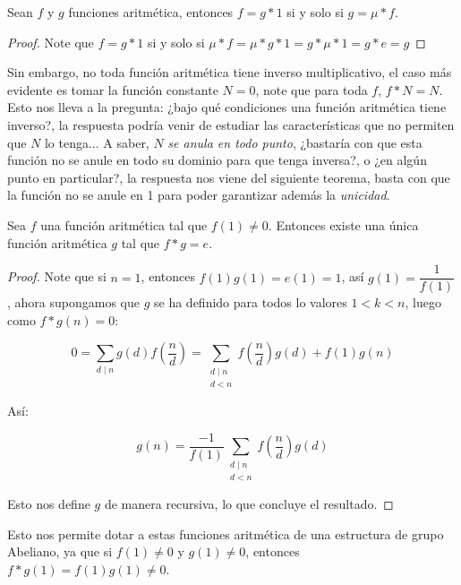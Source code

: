 \begin{theorem}
Sean $f$ y $g$ funciones aritmética, entonces $f=g*1$ si y solo si $g=\mu* f$.
\end{theorem}

\begin{proof}
Note que $f=g*1$ si y solo si $\mu*f=\mu*g*1=g*\mu*1=g*e=g$
\end{proof}

Sin embargo, no toda función aritmética tiene inverso multiplicativo, el caso más evidente es tomar la función constante $N=0$, note que para toda $f$, $f*N=N$. Esto nos lleva a la pregunta: ¿bajo qué condiciones una función aritmética tiene inverso?, la respuesta podría venir de estudiar las características que no permiten que $N$ lo tenga... A saber, $N$ \textit{se anula en todo punto}, ¿bastaría con que esta función no se anule en todo su dominio para que tenga inversa?, o ¿en algún punto en particular?, la respuesta nos viene del siguiente teorema, basta con que la función no se anule en 1 para poder garantizar además la \textit{unicidad}.\\

\begin{theorem}
 
Sea $f$ una función aritmética tal que $f(1) \neq 0$. Entonces existe una única función aritmética $g$ tal que $f*g=e$.

\end{theorem} 

\begin{proof}
Note que si $n=1$, entonces $f(1)g(1)=e(1)=1$, así $g(1)=\dfrac{1}{f(1)}$, ahora  supongamos que $g$ se ha definido para todos lo valores $1<k<n$, luego como $f*g(n)=0$:

\begin{equation}
0=\sum_{d\mid n}g(d)f \left( \frac{n}{d} \right)=\sum_{\substack{d \mid n \\
d<n}} f\left(\frac{n}{d}\right) g(d)+f(1) g(n)
\end{equation}

Así:

$$g(n) =\frac{-1}{f(1)} \sum_{\substack{d \mid n \\
d<n}} f\left(\frac{n}{d}\right) g(d)$$

Esto nos define $g$ de manera recursiva, lo que concluye el resultado.

\end{proof}


Esto nos permite dotar a estas funciones aritmética de una estructura de grupo Abeliano, ya que si $f(1)\neq 0$ y $g(1)\neq 0$, entonces $f*g(1)=f(1)g(1)\neq 0$.\\


